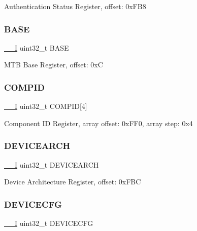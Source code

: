 Authentication Status Register, offset\+: 0x\+F\+B8 \mbox{\label{struct_m_t_b___type_a890f44fa11afe8e8452a179312dbbfd6}} 
\subsubsection{\texorpdfstring{BASE}{BASE}}
{\footnotesize\ttfamily \mbox{\hyperlink{core__cm0plus_8h_af63697ed9952cc71e1225efe205f6cd3}{\+\_\+\+\_\+I}} uint32\+\_\+t B\+A\+SE}

M\+TB Base Register, offset\+: 0xC \mbox{\label{struct_m_t_b___type_af0ce339042860625e784ddae3ef2e2b7}} 
\subsubsection{\texorpdfstring{COMPID}{COMPID}}
{\footnotesize\ttfamily \mbox{\hyperlink{core__cm0plus_8h_af63697ed9952cc71e1225efe205f6cd3}{\+\_\+\+\_\+I}} uint32\+\_\+t C\+O\+M\+P\+ID\mbox{[}4\mbox{]}}

Component ID Register, array offset\+: 0x\+F\+F0, array step\+: 0x4 \mbox{\label{struct_m_t_b___type_ac731ad5635ca4bf89e48c2a9e2547877}} 
\subsubsection{\texorpdfstring{DEVICEARCH}{DEVICEARCH}}
{\footnotesize\ttfamily \mbox{\hyperlink{core__cm0plus_8h_af63697ed9952cc71e1225efe205f6cd3}{\+\_\+\+\_\+I}} uint32\+\_\+t D\+E\+V\+I\+C\+E\+A\+R\+CH}

Device Architecture Register, offset\+: 0x\+F\+BC \mbox{\label{struct_m_t_b___type_af02c1de4dc7a10addebde14fb6e4fa40}} 
\subsubsection{\texorpdfstring{DEVICECFG}{DEVICECFG}}
{\footnotesize\ttfamily \mbox{\hyperlink{core__cm0plus_8h_af63697ed9952cc71e1225efe205f6cd3}{\+\_\+\+\_\+I}} uint32\+\_\+t D\+E\+V\+I\+C\+E\+C\+FG}

